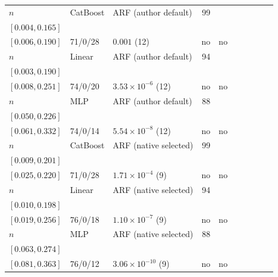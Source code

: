 \begin{longtable}{@{}ll>{\raggedright\arraybackslash}p{1.1in}rllrlll@{}}
$n$ & CatBoost & ARF (author default) & 99 & \begin{tabular}[t]{@{}l@{}}$0.084$\\\tiny$[0.004, 0.165]$\end{tabular} & \begin{tabular}[t]{@{}l@{}}$0.090$\\\tiny$[0.006, 0.190]$\end{tabular} & 71/0/28 & $0.001$ (12) & no & no \\
$n$ & Linear & ARF (author default) & 94 & \begin{tabular}[t]{@{}l@{}}$0.065$\\\tiny$[0.003, 0.190]$\end{tabular} & \begin{tabular}[t]{@{}l@{}}$0.090$\\\tiny$[0.008, 0.251]$\end{tabular} & 74/0/20 & $3.53\times 10^{-6}$ (12) & no & no \\
$n$ & MLP & ARF (author default) & 88 & \begin{tabular}[t]{@{}l@{}}$0.111$\\\tiny$[0.050, 0.226]$\end{tabular} & \begin{tabular}[t]{@{}l@{}}$0.144$\\\tiny$[0.061, 0.332]$\end{tabular} & 74/0/14 & $5.54\times 10^{-8}$ (12) & no & no \\
$n$ & CatBoost & ARF (native selected) & 99 & \begin{tabular}[t]{@{}l@{}}$0.083$\\\tiny$[0.009, 0.201]$\end{tabular} & \begin{tabular}[t]{@{}l@{}}$0.109$\\\tiny$[0.025, 0.220]$\end{tabular} & 71/0/28 & $1.71\times 10^{-4}$ (9) & no & no \\
$n$ & Linear & ARF (native selected) & 94 & \begin{tabular}[t]{@{}l@{}}$0.077$\\\tiny$[0.010, 0.198]$\end{tabular} & \begin{tabular}[t]{@{}l@{}}$0.104$\\\tiny$[0.019, 0.256]$\end{tabular} & 76/0/18 & $1.10\times 10^{-7}$ (9) & no & no \\
$n$ & MLP & ARF (native selected) & 88 & \begin{tabular}[t]{@{}l@{}}$0.142$\\\tiny$[0.063, 0.274]$\end{tabular} & \begin{tabular}[t]{@{}l@{}}$0.175$\\\tiny$[0.081, 0.363]$\end{tabular} & 76/0/12 & $3.06\times 10^{-10}$ (9) & no & no \\

\end{longtable}
